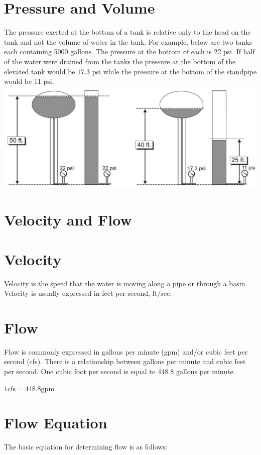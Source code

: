 \documentclass[10pt]{article}
\begin{document}
\section{Pressure and Volume}
The pressure exerted at the bottom of a tank is relative only to the head on the tank and not the volume of water in the tank. For example, below are two tanks each containing 5000 gallons. The pressure at the bottom of each is 22 psi. If half of the water were drained from the tanks the pressure at the bottom of the elevated tank would be $17.3$ psi while the pressure at the bottom of the standpipe would be 11 psi.\\

\includegraphics[max width=\textwidth]{2022_11_03_65aa625ded296bdfd01fg-18}

\section{Velocity and Flow}
\section{Velocity}
Velocity is the speed that the water is moving along a pipe or through a basin. Velocity is usually expressed in feet per second, $\mathrm{ft} / \mathrm{sec}$.

\section{Flow}
Flow is commonly expressed in gallons per minute (gpm) and/or cubic feet per second (cfs). There is a relationship between gallons per minute and cubic feet per second. One cubic foot per second is equal to $448.8$ gallons per minute.

$1 \mathrm{cfs}=448.8 \mathrm{gpm}$

\section{Flow Equation}
The basic equation for determining flow is as follows:
\end{document}
